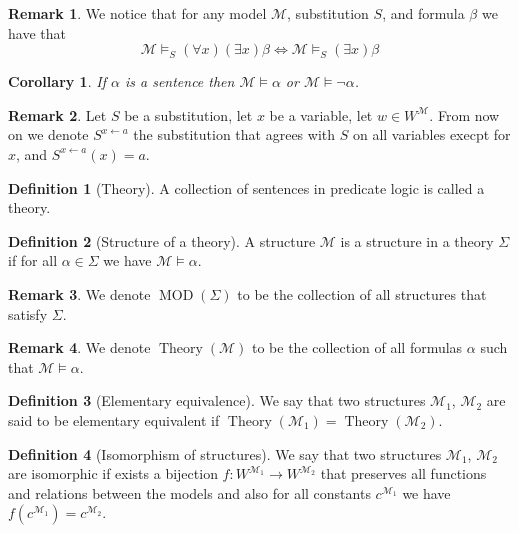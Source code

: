 \documentclass[11pt,a4paper]{article}
\theoremstyle{definition}
\newtheorem{definition}{Definition}[section]
\newtheorem{remark}{Remark}[section]
\theoremstyle{plain}
\newtheorem{corollary}[theorem]{Corollary}
\DeclareMathOperator{\MOD}{MOD}
\DeclareMathOperator{\Theory}{Theory}
\newcommand{\ot}{\leftarrow}
\newcommand{\M}{\mathcal{M}}
\begin{document}
  \begin{remark}
    We notice that for any model $\M$, substitution $S$, and formula $\beta$
    we have that
    \[
      \M \models_S (\forall x)(\exists x) \beta \iff
      \M \models_S (\exists x) \beta
    \]
  \end{remark}

  \begin{corollary}
    If $\alpha$ is a sentence then $\M \models \alpha$ or 
    $\M \models \neg \alpha$.
  \end{corollary}

  \begin{remark}
    Let $S$ be a substitution, let $x$ be a variable, let $w \in W^\M$.
    From now on we denote $S^{x \ot a}$ the substitution that agrees
    with $S$ on all variables execpt for $x$, and $S^{x \ot a}(x) = a$.
  \end{remark}


  \begin{definition}[Theory]
    A collection of sentences in predicate logic is called a theory.
  \end{definition}

  \begin{definition}[Structure of a theory]
    A structure $\M$ is a structure in a theory $\Sigma$ if for all
    $\alpha \in \Sigma$ we have $\M \models \alpha$.
  \end{definition}

  \begin{remark}
    We denote $\MOD(\Sigma)$ to be the collection of all structures that
    satisfy $\Sigma$.
  \end{remark}

  \begin{remark}
    We denote $\Theory(\M)$ to be the collection of all formulas $\alpha$
    such that $\M \models \alpha$.
  \end{remark}

  \begin{definition}[Elementary equivalence]
    We say that two structures $\M_1$, $\M_2$ are said to be elementary 
    equivalent if $\Theory(\M_1) = \Theory(\M_2)$.
  \end{definition}

  \begin{definition}[Isomorphism of structures]
    We say that two structures $\M_1$, $\M_2$ are isomorphic
    if exists a bijection $f \colon W^{\M_1} \to W^{\M_2}$ that preserves
    all functions and relations between the models and also
    for all constants $c^{\M_1}$ we have $f(c^{\M_1}) = c^{\M_2}$.
  \end{definition}
\end{document}
